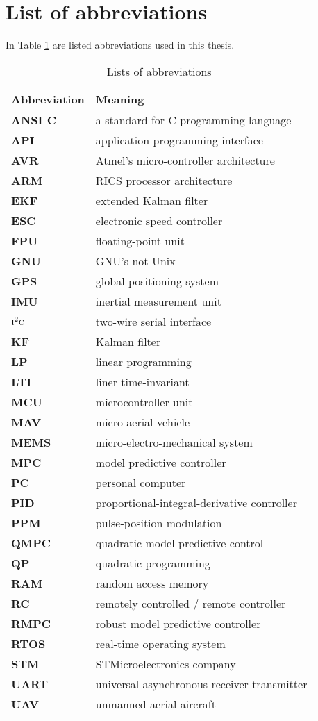 \section{List of abbreviations}\label{ape:abbreviations}

In Table \ref{table:abbreviations} are listed abbreviations used in this thesis.

\begin{table}[!htb]
\centering
\begin{tabular}{ll}
\hline
\textbf{Abbreviation} & \textbf{Meaning} \\
\hline
\textbf{ANSI C} & a standard for C programming language \\
\textbf{API} & application programming interface \\
\textbf{AVR} & Atmel's micro-controller architecture \\
\textbf{ARM} & RICS processor architecture \\
\textbf{EKF} & extended Kalman filter \\ 
\textbf{ESC} & electronic speed controller \\
\textbf{FPU} & floating-point unit \\
\textbf{GNU} & GNU's not Unix \\
\textbf{GPS} & global positioning system \\
\textbf{IMU} & inertial measurement unit \\
\textbf{$\textsc{i}^2\textsc{c}$} & two-wire serial interface\\
\textbf{KF} & Kalman filter \\
\textbf{LP} & linear programming \\
\textbf{LTI} & liner time-invariant \\
\textbf{MCU} & microcontroller unit \\
\textbf{MAV} & micro aerial vehicle \\
\textbf{MEMS} & micro-electro-mechanical system \\
\textbf{MPC} & model predictive controller \\
\textbf{PC} & personal computer \\
\textbf{PID} & proportional-integral-derivative controller \\
\textbf{PPM} & pulse-position modulation \\
\textbf{QMPC} & quadratic model predictive control\\
\textbf{QP} & quadratic programming \\
\textbf{RAM} & random access memory \\
\textbf{RC} & remotely controlled / remote controller \\
\textbf{RMPC} & robust model predictive controller \\
\textbf{RTOS} & real-time operating system \\
\textbf{STM} & STMicroelectronics company \\ 
\textbf{UART} & universal asynchronous receiver transmitter \\
\textbf{UAV} & unmanned aerial aircraft \\
\hline
\end{tabular}
\caption{Lists of abbreviations}
\label{table:abbreviations}
\end{table}